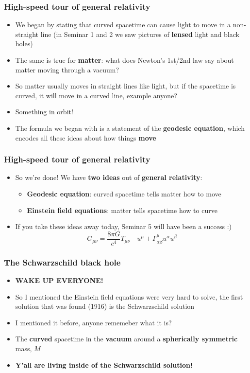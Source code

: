 \documentclass{beamer}
\begin{document}
\begin{frame}
  \frametitle{High-speed tour of general relativity}
  \begin{itemize}
    \item<1-> We began by stating that curved spacetime can cause light to move in a non-straight line (in Seminar 1 and 2 we saw pictures of \textbf{lensed} light and black holes)
    \item<2-> The same is true for \textbf{matter}: what does Newton's 1st/2nd law say about matter moving through a vacuum?
    \item<3-> So matter usually moves in straight lines like light, but if the spacetime is curved, it will move in a curved line, example anyone?
    \item<4-> Something in orbit!
    \item<5-> The formula we began with is a statement of the \textbf{geodesic equation}, which encodes all these ideas about how things \textbf{move}
  \end{itemize}
\end{frame}

\begin{frame}
  \frametitle{High-speed tour of general relativity}
  \begin{itemize}
    \item<1-> So we're done! We have \textbf{two ideas} out of \textbf{general relativity}:
      \begin{itemize}
	\item<2-> \textbf{Geodesic equation}: curved spacetime tells matter how to move
	\item<3-> \textbf{Einstein field equations}: matter tells spacetime how to curve
      \end{itemize}
    \item<4-> If you take these ideas away today, Seminar 5 will have been a success :)
      \begin{equation*}
	G_{\mu\nu}=\frac{8\pi G}{c^4}T_{\mu\nu}\quad \ddot{u}^\mu+\Gamma^\mu_{\alpha\beta}u^\alpha u^\beta
	\label{<+label+>}
      \end{equation*}
  \end{itemize}
\end{frame}

\begin{frame}
  \frametitle{The Schwarzschild black hole}
  \begin{itemize}
    \item<1-> \textbf{WAKE UP EVERYONE!}
    \item<2-> So I mentioned the Einstein field equations were very hard to solve, the first solution that was found (1916) is the Schwarzschild solution
    \item<3-> I mentioned it before, anyone rememeber what it is?
    \item<4-> The \textbf{curved} spacetime in the \textbf{vacuum} around a \textbf{spherically symmetric} mass, $M$
    \item<5-> \textbf{Y'all are living inside of the Schwarzschild solution!}
  \end{itemize}
\end{frame}
\end{document}
